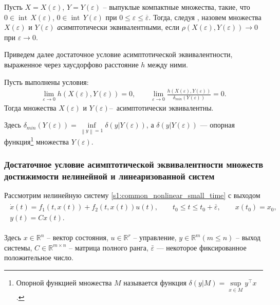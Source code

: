 \documentclass[../main.tex]{subfiles}
\begin{document}
Пусть $ X = X(\varepsilon) $,  $ Y = Y(\varepsilon) $ -- выпуклые компактные множества, такие, что $ 0 \in \operatorname{int}\,X(\varepsilon) $, $ 0 \in \operatorname{int}\,Y(\varepsilon) $ при $0 \leqslant \varepsilon \leqslant \overline{\varepsilon} $.
Тогда, следуя \cite{Ovs}, назовем множества $  X(\varepsilon)  $ и $  Y(\varepsilon) $ {\textit асимптотически эквивалентными}, если $  \rho (X(\varepsilon), Y(\varepsilon)) \rightarrow 0 $ при $\varepsilon \rightarrow 0 $.

Приведем далее достаточное условие асимптотической эквивалентности, выраженное через хаусдорфово расстояние $ h $ между ними.
\begin{theorem}\label{suff}\cite{GusevUMJ}
     Пусть выполнены условия:
    \begin{gather*}
        \lim\limits_{\varepsilon \rightarrow 0}h(X(\varepsilon),Y(\varepsilon)) = 0, \qquad    \lim\limits_{\varepsilon \rightarrow 0}\frac{h(X(\varepsilon),Y(\varepsilon))}{\delta_{min}(Y(\varepsilon))} = 0.
    \end{gather*}
    Тогда множества $ X(\varepsilon) $ и $ Y(\varepsilon) $\---~асимптотически эквивалентны. 
    
    Здесь $ \delta_{min}(Y(\varepsilon)) = \inf\limits_{\left\|y \right\| =1 } \delta(y|Y(\varepsilon))$, а $ \delta(y|Y(\varepsilon)) $ --- опорная функция\footnote{
    Опорной функцией множества $M$ называется функция $\delta(y|M) = \sup\limits_{x \in M} y^{\top} x$. 
    } множества $ Y(\varepsilon) $.
\end{theorem}
\subsubsection{Достаточное условие асимптотической эквивалентности множеств достижимости нелинейной и линеаризованной систем}
    Рассмотрим нелинейную систему \eqref{s1:common_nonlinear_small_time} с выходом
\begin{gather}\label{s2:nonlinear_with_output}
    \begin{gathered}
        \dot{x}(t)=f_1(t,x(t))+f_2(t,x(t))u(t), \qquad t_0 \leqslant t \leqslant t_0 + \overline{\varepsilon}, \qquad x(t_0) = x_0, \\
        y(t) = C x(t).
    \end{gathered}
\end{gather}

Здесь $ x \in \mathbb{R}^n $ -- вектор состояния, $ u \in \mathbb{R}^r $ -- управление,  $ y\in\mathbb{R}^m (m \leqslant n) $ -- выход системы,
$ C\in \mathbb{R}^{m \times n} $  -- матрица полного ранга,  $ \bar{\varepsilon} $ --- некоторое фиксированное положительное число.
\end{document}
